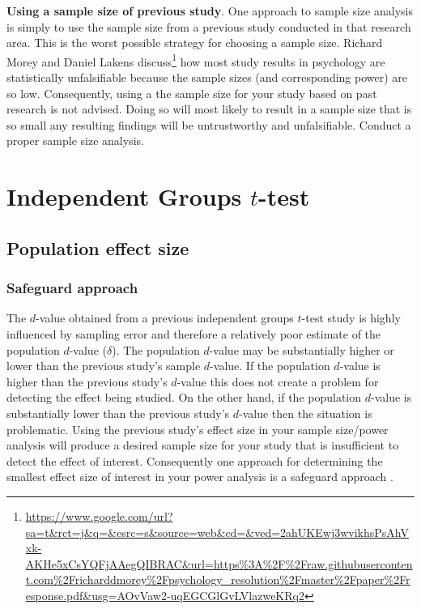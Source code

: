 \documentclass[
]{krantz}
\makeatletter
\renewcommand{\href}[2]{#2\footnote{\url{#1}}}
\newenvironment{kframe}{%
\medskip{}
\setlength{\fboxsep}{.8em}
 \def\at@end@of@kframe{}%
 \ifinner\ifhmode%
  \def\at@end@of@kframe{\end{minipage}}%
  \begin{minipage}{\columnwidth}%
 \fi\fi%
 \def\FrameCommand##1{\hskip\@totalleftmargin \hskip-\fboxsep
 \colorbox{shadecolor}{##1}\hskip-\fboxsep
     \hskip-\linewidth \hskip-\@totalleftmargin \hskip\columnwidth}%
 \MakeFramed {\advance\hsize-\width
   \@totalleftmargin\z@ \linewidth\hsize
   \@setminipage}}%
 {\par\unskip\endMakeFramed%
 \at@end@of@kframe}
\newenvironment{rmdblock}[1]
  {
  \begin{itemize}
  \renewcommand{\labelitemi}{
    \raisebox{-.7\height}[0pt][0pt]{
      {\setkeys{Gin}{width=3em,keepaspectratio}\texttt{[image: images/\#1]}}
    }
  }
  \setlength{\fboxsep}{1em}
  \begin{kframe}
  \item
  }
  {
  \end{kframe}
  \end{itemize}
  }
\newenvironment{rmdcaution}
  {\begin{rmdblock}{caution}}
  {\end{rmdblock}}
\makeatother
\begin{document}
\begin{rmdcaution}
\textbf{Using a sample size of previous study}. One approach to sample size analysis is simply to use the sample size from a previous study conducted in that research area. This is the worst possible strategy for choosing a sample size. Richard Morey and Daniel Lakens \href{https://www.google.com/url?sa=t\&rct=j\&q=\&esrc=s\&source=web\&cd=\&ved=2ahUKEwj3wvikhsPsAhVxk-AKHe5xCsYQFjAAegQIBRAC\&url=https\%3A\%2F\%2Fraw.githubusercontent.com\%2Fricharddmorey\%2Fpsychology_resolution\%2Fmaster\%2Fpaper\%2Fresponse.pdf\&usg=AOvVaw2-uqEGCGlGvLVlazweKRq2}{discuss} how most study results in psychology are statistically unfalsifiable because the sample sizes (and corresponding power) are so low. Consequently, using a the sample size for your study based on past research is not advised. Doing so will most likely to result in a sample size that is so small any resulting findings will be untrustworthy and unfalsifiable. Conduct a proper sample size analysis.
\end{rmdcaution}

\hypertarget{independent-groups-t-test}{%
\section{\texorpdfstring{Independent Groups \(t\)-test}{Independent Groups t-test}}\label{independent-groups-t-test}}

\hypertarget{population-effect-size}{%
\subsection{Population effect size}\label{population-effect-size}}

\hypertarget{safeguard-approach}{%
\subsubsection{Safeguard approach}\label{safeguard-approach}}

The \(d\)-value obtained from a previous independent groups \(t\)-test study is highly influenced by sampling error and therefore a relatively poor estimate of the population \(d\)-value (\(\delta\)). The population \(d\)-value may be substantially higher or lower than the previous study's sample \(d\)-value. If the population \(d\)-value is higher than the previous study's \(d\)-value this does not create a problem for detecting the effect being studied. On the other hand, if the population \(d\)-value is substantially lower than the previous study's \(d\)-value then the situation is problematic. Using the previous study's effect size in your sample size/power analysis will produce a desired sample size for your study that is insufficient to detect the effect of interest. Consequently one approach for determining the smallest effect size of interest in your power analysis is a safeguard approach \citep{perugini2014safeguard}.
\end{document}
